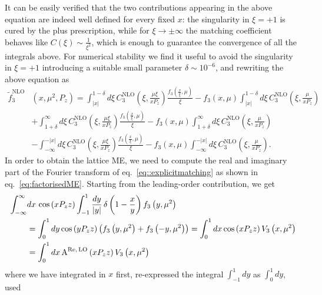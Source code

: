 It can be easily verified that the two contributions appearing in the above
equation are indeed well defined for every fixed $x$: the singularity in
$\xi=+1$ is cured by the plus prescription, while for $\xi\rightarrow \pm
\infty$ the matching coefficient behaves like $C\left(\xi\right)\sim
\frac{1}{\xi^2}$, which is enough to guarantee the convergence of all the
integrals above. For numerical stability we find it useful to avoid the
singularity in $\xi = +1$ introducing a suitable small parameter $\delta \sim
10^{-6}$, and rewriting the above equation as
\begin{equation}
	\label{eq::explicitplus}
	\begin{split}
		\tilde{f}_3^{\text{NLO}}&\left(x,\mu^2,P_z\right)
		=\int_{|x|}^{1-\delta} d\xi\,
		C_3^{\text{NLO}}\left(\xi,\frac{\mu\xi}{xP_z}\right)
		\frac{f_3\left(\frac{x}{\xi},\mu\right)}{\xi} - 
		f_3\left(x,\mu\right) \int_{|x|}^{1-\delta} d\xi\,
		C_3^{\text{NLO}}\left(\xi,\frac{\mu}{xP_z}\right) \\
		& + \int_{1+\delta}^{\infty}d\xi\,
		C_3^{\text{NLO}}\left(\xi,\frac{\mu\xi}{xP_z}\right)
		\frac{f_3\left(\frac{x}{\xi},\mu\right)}{\xi} - 
		f_3\left(x,\mu\right) \int_{1+\delta}^{\infty}d\xi\,
		C_3^{\text{NLO}}\left(\xi,\frac{\mu}{xP_z}\right) \\
		& - \int_{-\infty}^{-|x|} d\xi\, 
		C_3^{\text{NLO}}\left(\xi,\frac{\mu\xi}{xP_z}\right)
		\frac{f_3\left(\frac{x}{\xi},\mu\right)}{\xi} - 
		f_3\left(x,\mu\right) \int_{-\infty}^{-|x|}d\xi\, 
		C_3^{\text{NLO}}\left(\xi,\frac{\mu}{xP_z}\right).
	\end{split}
\end{equation}
%
In order to obtain the lattice ME, we need to compute the real and imaginary part
of the Fourier transform of eq.~\eqref{eq::explicitmatching} as shown in
eq.~\eqref{eq:factorisedME}. Starting from the leading-order contribution, we get
\begin{align}
	\label{eq::LO}
	\int_{-\infty}^{\infty}& dx\, \cos\left(x P_z z\right) \int_{-1}^{1} \frac{dy}{|y|}\, \delta\left( 1-\frac{x}{y} \right)  
	f_{3}\left( y, {\mu}^2\right)  \nonumber \\
	&= \int_0^1 dy \cos\left( y P_z z  \right) \left( f_{3}\left( y, {\mu}^2\right) + f_{3}\left( -y, {\mu}^2\right)  \right) = 
	\int_0^1 dx \cos\left( x P_z z  \right) V_3 \left( x, {\mu}^2 \right) \nonumber \\
	&= \int_0^1 dx\, \text{A}^{\text{Re}, \,\text{LO}} \left( x P_z z \right) V_3 \left( x, {\mu}^2 \right)
\end{align}
where we have integrated in $x$ first, re-expressed the integral $\int_{-1}^1 dy$ as $\int_0^1 dy$, used
